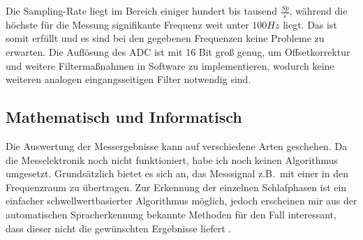 \documentclass[12pt,a4paper,notitlepage]{article}
\begin{document}
Die \gls{Sampling}-Rate liegt im Bereich einiger hundert bis tausend $\frac{Sp}{s}$, während die höchste für die Messung signifikante Frequenz weit unter $100Hz$ liegt. Das  ist somit erfüllt und es sind bei den gegebenen Frequenzen keine Probleme zu erwarten.
Die Auflösung des \gls{ADC} ist mit 16 Bit groß genug, um \gls{Offsetkorrektur} und weitere Filtermaßnahmen in Software zu implementieren, wodurch keine weiteren analogen eingangsseitigen Filter notwendig sind.

\subsection{Mathematisch und Informatisch}
Die Auswertung der Messergebnisse kann auf verschiedene Arten geschehen. Da die Messelektronik noch nicht funktioniert, habe ich noch keinen Algorithmus umgesetzt.
Grundsätzlich bietet es sich an, das Messsignal z.B.\ mit einer  in den Frequenzraum zu übertragen. Zur Erkennung der einzelnen Schlafphasen ist ein einfacher schwellwertbasierter Algorithmus möglich, jedoch erscheinen mir aus der automatischen Spracherkennung bekannte Methoden für den Fall interessant, dass dieser nicht die gewünschten Ergebnisse liefert
\cite{WP2,WP11,WP12,WP13}.
\end{document}
